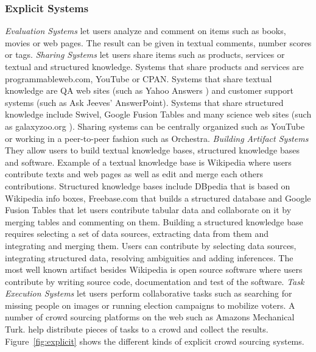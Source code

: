 \documentclass{sig-alternate}
\begin{document}
\subsubsection{Explicit Systems}
\textit{Evaluation Systems} let users analyze and comment on items such as books, movies or web pages. The result can be given in textual comments, number scores or tags.
\newline\newline
\textit{Sharing Systems} let users share items such as products, services or textual and structured knowledge. Systems that share products and services \cite{grewing2010sozial} are programmableweb.com,  YouTube or CPAN. Systems that share textual knowledge are QA web sites (such as Yahoo Answers  \cite{Adamic08} ) and customer support systems (such as Ask Jeeves' AnswerPoint). Systems that share structured knowledge include Swivel, Google Fusion Tables \cite{Gonzalez2010} and many science web sites (such as galaxyzoo.org \cite{oxford-galaxy-zoo-opens-2007}). Sharing systems can be centrally organized such as YouTube or working in a peer-to-peer fashion such as Orchestra.
\newline\newline
\textit{Building Artifact Systems} They allow users to build textual knowledge bases, structured knowledge bases and software. Example of a textual knowledge base is Wikipedia where users contribute texts and web pages as well as edit and merge each others contributions. Structured knowledge bases include DBpedia \cite{DBpediaRelationshipFinder} that is based on Wikipedia info boxes, Freebase.com \cite{bollacker-k-2008-1} that builds a structured database and Google Fusion Tables that let users contribute tabular data and collaborate on it by merging tables and commenting on them. Building a structured knowledge base requires selecting a set of data sources, extracting data from them and integrating and merging them. Users can contribute by selecting data sources, integrating structured data, resolving ambiguities and adding inferences. The most well known artifact besides Wikipedia is open source software where users contribute by writing source code, documentation and test of the software.
\newline\newline
\textit{Task Execution Systems} let users perform collaborative tasks such as searching for missing people on images or running election campaigns to mobilize voters. A number of crowd sourcing platforms on the  web such as Amazons Mechanical Turk.  \cite{journals/crossroads/Ipeirotis10} help distribute pieces of tasks to a crowd and collect the results. Figure~\ref{fig:explicit} shows the different kinds of explicit crowd sourcing systems.
\end{document}
